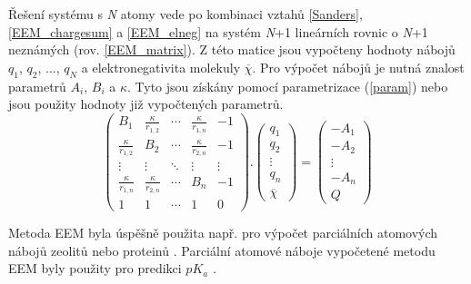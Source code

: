 Řešení systému s \textit{N} atomy vede po kombinaci vztahů  \ref{Sanders}, \ref{EEM_chargesum} a \ref{EEM_elneg} na systém \textit{N}+1 lineárních rovnic o \textit{N}+1 neznámých (rov. \ref{EEM_matrix}). Z této matice jsou vypočteny hodnoty nábojů $q_1$, $q_2$, ..., $q_N$ a elektronegativita molekuly $\overline{\chi}$. Pro výpočet nábojů je nutná znalost parametrů $A_i$, $B_i$ a $\kappa$. Tyto jsou získány pomocí parametrizace (\ref{param}) nebo jsou použity hodnoty již vypočtených parametrů. 
\newpage
\begin{equation}
\label{EEM_matrix}
 \begin{pmatrix}
  B_{1} & \frac{\kappa}{r_{1,2}} & \cdots & \frac{\kappa}{r_{1,n}} & -1\\
  \frac{\kappa}{r_{1,2}} & B_{2} & \cdots & \frac{\kappa}{r_{2,n}} & -1 \\
  \vdots  & \vdots  & \ddots & \vdots & \vdots  \\
  \frac{\kappa}{r_{1,n}} & \frac{\kappa}{r_{2,n}} & \cdots & B_{n} & -1 \\
  1 & 1 & \cdots & 1 & 0
 \end{pmatrix} .
 \begin{pmatrix}
 q_{1} \\ q_{2} \\ \vdots \\ q_{n} \\ \overline{\chi}
 \end{pmatrix} =
 \begin{pmatrix}
 -A_{1} \\ -A_{2} \\ \vdots \\ -A_{n} \\ Q
 \end{pmatrix}
\end{equation}

Metoda EEM byla úspěšně použita např. pro výpočet parciálních atomových nábojů zeolitů \cite{zeolites} nebo proteinů \cite{eem_protein}. Parciální atomové náboje vypočetené metodu EEM byly použity pro predikci $pK_a$ \cite{QSPR2}.


